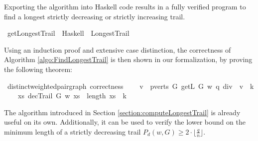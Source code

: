 \begin{isabellebody}
\begin{isamarkuptext}%
Exporting the algorithm into Haskell code results in a fully verified program to find a longest
strictly decreasing or strictly increasing trail.%
\end{isamarkuptext}\isamarkuptrue%
\isamarkupfalse%
\ getLongestTrail\ \ Haskell\ \ LongestTrail%
\isadelimproof
%
\endisadelimproof
%
\isatagproof
%
\endisatagproof
{\isafoldproof}%
%
\isadelimproof
%
\endisadelimproof
%
\isadelimproof
%
\endisadelimproof
%
\isatagproof
%
\endisatagproof
{\isafoldproof}%
%
\isadelimproof
%
\endisadelimproof
%
\isadelimproof
%
\endisadelimproof
%
\isatagproof
%
\endisatagproof
{\isafoldproof}%
%
\isadelimproof
%
\endisadelimproof
%
\isadelimproof
%
\endisadelimproof
%
\isatagproof
%
\endisatagproof
{\isafoldproof}%
%
\isadelimproof
%
\endisadelimproof
%
\begin{isamarkuptext}%
Using an induction proof and extensive case distinction, the correctness of Algorithm \ref{algo:FindLongestTrail} 
is then shown in our formalization, by proving the following theorem:%
\end{isamarkuptext}\isamarkuptrue%
\isamarkupfalse%
{\isacharparenleft}\ distinct{\isacharunderscore}weighted{\isacharunderscore}pair{\isacharunderscore}graph{\isacharparenright}\ correctness{\isacharcolon}\isanewline
\ \ \ {\isachardoublequoteopen}{\isasymexists}\ v\ {\isasymin}\ {\isacharparenleft}pverts\ G{\isacharparenright}{\isachardot}\ getL\ G\ w\ {\isacharparenleft}q\ div\ {}{\isacharparenright}\ v\ {\isacharequal}\ k{\isachardoublequoteclose}\isanewline
\ \ \ {\isachardoublequoteopen}{\isasymexists}\ xs{\isachardot}\ decTrail\ G\ w\ xs\ {\isasymand}\ length\ xs\ {\isacharequal}\ k{\isachardoublequoteclose}%
\isadelimproof
%
\endisadelimproof
%
\isatagproof
%
\endisatagproof
{\isafoldproof}%
%
\isadelimproof
%
\endisadelimproof
%
\isadelimproof
%
\endisadelimproof
%
\isatagproof
%
\endisatagproof
{\isafoldproof}%
%
\isadelimproof
%
\endisadelimproof
%
\isadelimdocument
%
\endisadelimdocument
%
\isatagdocument
%
\isamarkuptrue%
%
\endisatagdocument
{\isafolddocument}%
%
\isadelimdocument
%
\endisadelimdocument
%
\isadelimproof
%
\endisadelimproof
%
\isatagproof
%
\endisatagproof
{\isafoldproof}%
%
\isadelimproof
%
\endisadelimproof
%
\begin{isamarkuptext}%
\label{section:minLength}
The algorithm introduced in Section \ref{section:computeLongestTrail} is already useful on its own. Additionally, it can be
used to verify the lower bound on the minimum length of a strictly decreasing trail $P_d(w,G) \ge 2 \cdot \lfloor \frac{q}{n} \rfloor$.


\end{isamarkuptext}
\end{isabellebody}
